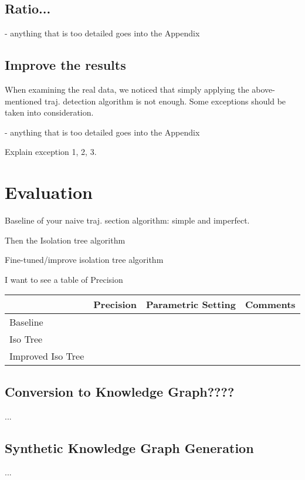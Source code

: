 \documentclass[runningheads]{llncs}
\begin{document}
\subsection{Ratio...}
- anything that is too detailed goes into the Appendix

\subsection{Improve the results}
\label{sec:improve}



When examining the real data, we noticed that simply applying the above-mentioned traj. detection algorithm is not enough. Some exceptions should be taken into consideration. 

- anything that is too detailed goes into the Appendix

Explain exception 1, 2, 3.

\section{Evaluation}
\label{sec:evaluation}


Baseline of your naive traj. section algorithm: simple and imperfect. 

Then the Isolation tree algorithm 

Fine-tuned/improve isolation tree algorithm 

I want to see a table of Precision 

\begin{table}[]
\begin{tabular}{l|l|l|l}
                  & Precision & Parametric Setting & Comments \\ \hline
Baseline          &           &                    &          \\
Iso Tree          &           &                    &          \\
Improved Iso Tree &           &                    &         
\end{tabular}
\end{table}



\subsection{Conversion to Knowledge Graph????}
...

\subsection{Synthetic Knowledge Graph Generation}
...
\end{document}
